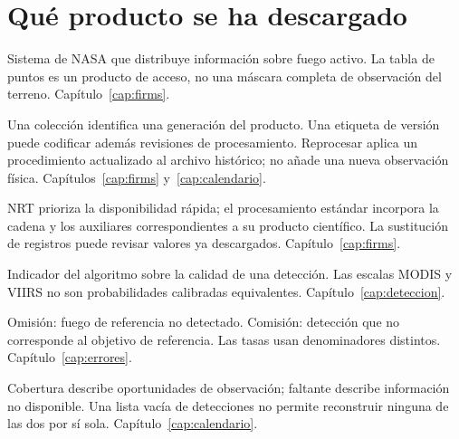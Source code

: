 \section{Qué producto se ha descargado}
\begin{description}[style=nextline,leftmargin=1.2em]
\item[FIRMS.] Sistema de NASA que distribuye información sobre fuego activo. La tabla
de puntos es un producto de acceso, no una máscara completa de observación del terreno.
Capítulo~\ref{cap:firms}.
\item[Colección, versión y reprocesamiento.] Una colección identifica una generación
del producto. Una etiqueta de versión puede codificar además revisiones de procesamiento.
Reprocesar aplica un procedimiento actualizado al archivo histórico; no añade una nueva
observación física. Capítulos~\ref{cap:firms} y~\ref{cap:calendario}.
\item[NRT y calidad estándar.] NRT prioriza la disponibilidad rápida; el procesamiento
estándar incorpora la cadena y los auxiliares correspondientes a su producto científico.
La sustitución de registros puede revisar valores ya descargados. Capítulo~\ref{cap:firms}.
\item[Confianza de detección.] Indicador del algoritmo sobre la calidad de una detección.
Las escalas MODIS y VIIRS no son probabilidades calibradas equivalentes.
Capítulo~\ref{cap:deteccion}.
\item[Omisión y comisión.] Omisión: fuego de referencia no detectado. Comisión: detección
que no corresponde al objetivo de referencia. Las tasas usan denominadores distintos.
Capítulo~\ref{cap:errores}.
\item[Cobertura y dato faltante.] Cobertura describe oportunidades de observación;
faltante describe información no disponible. Una lista vacía de detecciones no permite
reconstruir ninguna de las dos por sí sola. Capítulo~\ref{cap:calendario}.
\end{description}

